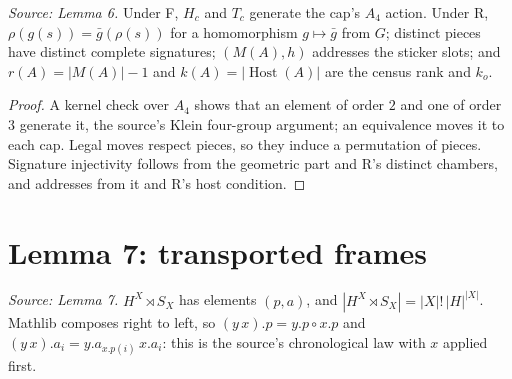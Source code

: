 \begin{theorem}[Lemma 6]
  \label{thm:lemma-six}
  \leanok
  \textit{Source: Lemma 6.}
  Under F, \(H_c\) and \(T_c\) generate the cap's \(A_4\) action. Under R,
  \(\rho(g(s))=\bar g(\rho(s))\) for a homomorphism \(g\mapsto\bar g\) from
  \(G\); distinct pieces have distinct complete signatures; \((M(A),h)\)
  addresses the sticker slots; and \(r(A)=|M(A)|-1\) and
  \(k(A)=|\operatorname{Host}(A)|\) are the census rank and \(k_o\).
\end{theorem}
\begin{proof}
  \leanok
  A kernel check over \(A_4\) shows that an element of order \(2\) and one
  of order \(3\) generate it, the source's Klein four-group argument; an
  equivalence moves it to each cap. Legal moves respect pieces, so they
  induce a permutation of pieces. Signature injectivity follows from the
  geometric part and R's distinct chambers, and addresses from it and R's
  host condition.
\end{proof}

\section{Lemma 7: transported frames}

\begin{definition}
  \label{def:frame-wreath}
  \leanok
  \textit{Source: Lemma 7.}
  \(H^X\rtimes S_X\) has elements \((p,a)\), and
  \(|H^X\rtimes S_X|=|X|!\,|H|^{|X|}\). Mathlib composes right to left, so
  \((y\,x).p=y.p\circ x.p\) and \((y\,x).a_i=y.a_{x.p(i)}\,x.a_i\): this is
  the source's chronological law with \(x\) applied first.
\end{definition}

